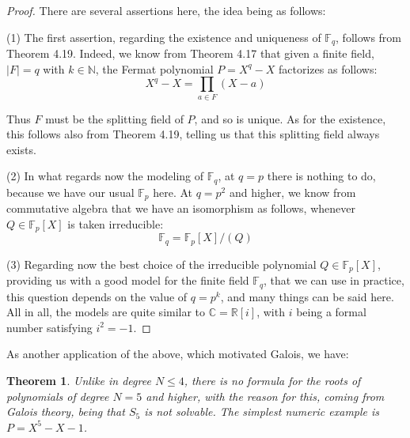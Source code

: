 \documentclass[12pt]{amsbook}
\newtheorem{theorem}{Theorem}[chapter]
\begin{document}
\begin{proof}
There are several assertions here, the idea being as follows:

\medskip

(1) The first assertion, regarding the existence and uniqueness of $\mathbb F_q$, follows from Theorem 4.19. Indeed, we know from Theorem 4.17 that given a finite field, $|F|=q$ with $k\in\mathbb N$, the Fermat polynomial $P=X^q-X$ factorizes as follows:
$$X^q-X=\prod_{a\in F}(X-a)$$

Thus $F$ must be the splitting field of $P$, and so is unique. As for the existence, this follows also from Theorem 4.19, telling us that this splitting field always exists.

\medskip

(2) In what regards now the modeling of $\mathbb F_q$, at $q=p$ there is nothing to do, because we have our usual $\mathbb F_p$ here. At $q=p^2$ and higher, we know from commutative algebra that we have an isomorphism as follows, whenever $Q\in\mathbb F_p[X]$ is taken irreducible:
$$\mathbb F_q=\mathbb F_p[X]/(Q)$$

(3) Regarding now the best choice of the irreducible polynomial $Q\in\mathbb F_p[X]$, providing us with a good model for the finite field $\mathbb F_q$, that we can use in practice, this question depends on the value of $q=p^k$, and many things can be said here. All in all, the models are quite similar to $\mathbb C=\mathbb R[i]$, with $i$ being a formal number satisfying $i^2=-1$.
\end{proof}

As another application of the above, which motivated Galois, we have:


\begin{theorem}
Unlike in degree $N\leq4$, there is no formula for the roots of polynomials of degree $N=5$ and higher, with the reason for this, coming from Galois theory, being that $S_5$ is not solvable. The simplest numeric example is $P=X^5-X-1$.
\end{theorem}
\end{document}
